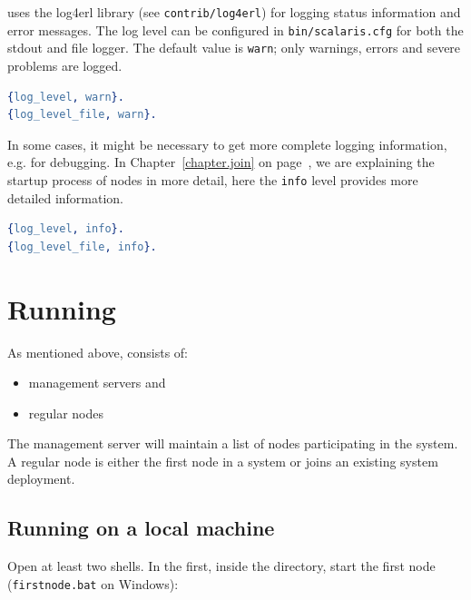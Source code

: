 \documentclass[a4paper]{scrreprt}
\newcommand{\sieheref}[1]{\ref{#1} on page~\pageref{#1}}
\newcommand{\code}[1]{\lstinline[basicstyle=\ttfamily]!#1!}
\begin{document}
\scalaris{} uses the log4erl library (see \code{contrib/log4erl}) for
logging status information and error messages. The log level can be
configured in \code{bin/scalaris.cfg} for both the stdout and file logger.
The default value is {\tt warn}; only warnings, errors and severe problems are
logged.

\begin{lstlisting}[language=erlang]
%% @doc Loglevel: debug < info < warn < error < fatal < none
{log_level, warn}.
{log_level_file, warn}.
\end{lstlisting}

In some cases, it might be necessary to get more complete logging
information, e.g. for debugging. In Chapter~\sieheref{chapter.join},
we are explaining the startup process of \scalaris{} nodes in more
detail, here the {\tt info} level provides more detailed information.

\begin{lstlisting}[language=erlang]
%% @doc Loglevel: debug < info < warn < error < fatal < none
{log_level, info}.
{log_level_file, info}.
\end{lstlisting}


\section{Running \scalaris{}}

As mentioned above, \scalaris{} consists of:
\begin{itemize}
\setlength{\itemsep}{0pt}
\setlength{\parskip}{0pt}
\item management servers and
\item regular nodes
\end{itemize}

The management server will maintain a list of nodes participating in the
system. A regular node is either the first node in a system or joins an
existing system deployment.

\subsection{Running on a local machine}
\label{sec.boot}

Open at least two shells. In the first, inside the \scalaris{} directory,
start the first node (\code{firstnode.bat} on Windows):
\begin{lstlisting}[language=sh]
%> ./bin/firstnode.sh
\end{lstlisting}
\end{document}
